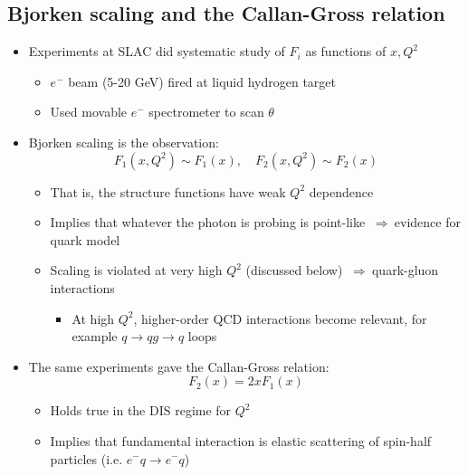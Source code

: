 \documentclass[11pt]{article}
\newcommand{\el}{\ensuremath{e^{-}}\xspace}
\newcommand{\thus}{\ensuremath{~\Rightarrow~}}
\begin{document}
\subsection{Bjorken scaling and the Callan-Gross relation}
\begin{itemize}
  \item Experiments at SLAC did systematic study of $F_i$ as functions of $x,Q^2$
  \begin{itemize}
    \item \el beam (5-20 GeV) fired at liquid hydrogen target
    \item Used movable \el spectrometer to scan $\theta$
  \end{itemize}
  \item Bjorken scaling is the observation:
  \begin{equation}
    F_1(x,Q^2) \sim F_1(x),\quad F_2(x,Q^2)\sim F_2(x)
  \end{equation}
  \begin{itemize}
    \item That is, the structure functions have weak $Q^2$ dependence
    \item Implies that whatever the photon is probing is point-like \thus evidence for quark model
    \item Scaling is violated at very high $Q^2$ (discussed below) \thus quark-gluon interactions
    \begin{itemize}
      \item At high $Q^2$, higher-order QCD interactions become relevant, for example $q\rightarrow qg \rightarrow q$ loops
    \end{itemize}
  \end{itemize}
  \item The same experiments gave the Callan-Gross relation:
  \begin{equation}
    F_2(x) = 2xF_1(x)
  \end{equation}
  \begin{itemize}
    \item Holds true in the DIS regime for $Q^2$
    \item Implies that fundamental interaction is elastic scattering of spin-half particles (i.e. $\el q\rightarrow \el q$)
  \end{itemize}
\end{itemize}
\end{document}
